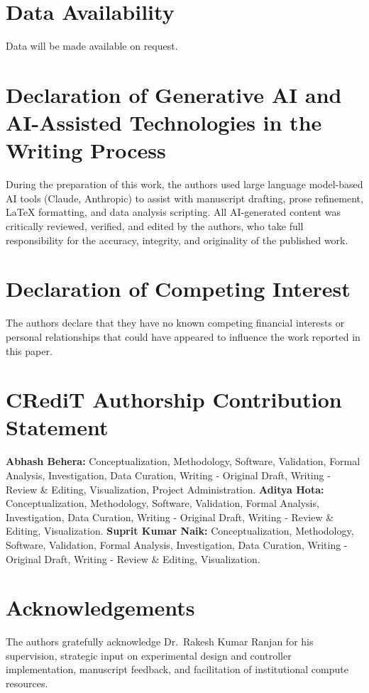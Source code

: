 \documentclass[3p,twocolumn]{elsarticle}
\theoremstyle{plain}%
\theoremstyle{definition}%
\begin{document}
\section*{Data Availability}

Data will be made available on request.

\section*{Declaration of Generative AI and AI-Assisted Technologies in the Writing Process}

During the preparation of this work, the authors used large language model-based AI tools (Claude, Anthropic) to assist with manuscript drafting, prose refinement, LaTeX formatting, and data analysis scripting. All AI-generated content was critically reviewed, verified, and edited by the authors, who take full responsibility for the accuracy, integrity, and originality of the published work.

\section*{Declaration of Competing Interest}
The authors declare that they have no known competing financial interests or personal relationships that could have appeared to influence the work reported in this paper.

\section*{CRediT Authorship Contribution Statement}

\textbf{Abhash Behera:} Conceptualization, Methodology, Software, Validation, Formal Analysis, Investigation, Data Curation, Writing - Original Draft, Writing - Review \& Editing, Visualization, Project Administration.
\textbf{Aditya Hota:} Conceptualization, Methodology, Software, Validation, Formal Analysis, Investigation, Data Curation, Writing - Original Draft, Writing - Review \& Editing, Visualization.
\textbf{Suprit Kumar Naik:} Conceptualization, Methodology, Software, Validation, Formal Analysis, Investigation, Data Curation, Writing - Original Draft, Writing - Review \& Editing, Visualization.

\section*{Acknowledgements}
The authors gratefully acknowledge Dr.\ Rakesh Kumar Ranjan for his supervision, strategic input on experimental design and controller implementation, manuscript feedback, and facilitation of institutional compute resources.





\end{document}
